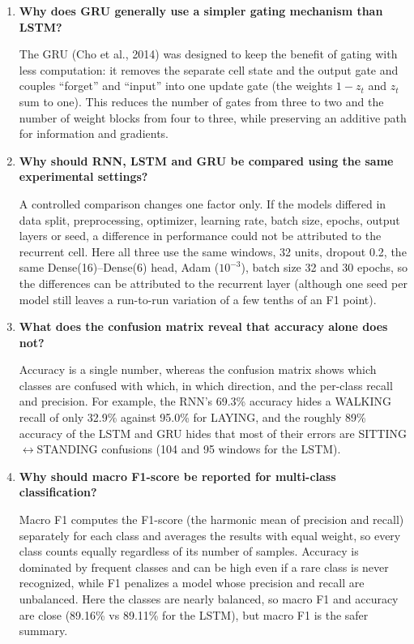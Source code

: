 \documentclass[10pt]{article}
\begin{document}
\begin{enumerate}[itemsep=6pt,topsep=3pt]
\item \textbf{Why does GRU generally use a simpler gating mechanism than LSTM?}\par\smallskip
The GRU (Cho et al., 2014) was designed to keep the benefit of gating with less computation: it removes the separate cell state and the output gate and couples ``forget'' and ``input'' into one update gate (the weights $1-z_t$ and $z_t$ sum to one). This reduces the number of gates from three to two and the number of weight blocks from four to three, while preserving an additive path for information and gradients.

\item \textbf{Why should RNN, LSTM and GRU be compared using the same experimental settings?}\par\smallskip
A controlled comparison changes one factor only. If the models differed in data split, preprocessing, optimizer, learning rate, batch size, epochs, output layers or seed, a difference in performance could not be attributed to the recurrent cell. Here all three use the same windows, 32 units, dropout 0.2, the same Dense(16)--Dense(6) head, Adam ($10^{-3}$), batch size 32 and 30 epochs, so the differences can be attributed to the recurrent layer (although one seed per model still leaves a run-to-run variation of a few tenths of an F1 point).

\item \textbf{What does the confusion matrix reveal that accuracy alone does not?}\par\smallskip
Accuracy is a single number, whereas the confusion matrix shows which classes are confused with which, in which direction, and the per-class recall and precision. For example, the RNN's 69.3\% accuracy hides a WALKING recall of only 32.9\% against 95.0\% for LAYING, and the roughly 89\% accuracy of the LSTM and GRU hides that most of their errors are SITTING$\leftrightarrow$STANDING confusions (104 and 95 windows for the LSTM).

\item \textbf{Why should macro F1-score be reported for multi-class classification?}\par\smallskip
Macro F1 computes the F1-score (the harmonic mean of precision and recall) separately for each class and averages the results with equal weight, so every class counts equally regardless of its number of samples. Accuracy is dominated by frequent classes and can be high even if a rare class is never recognized, while F1 penalizes a model whose precision and recall are unbalanced. Here the classes are nearly balanced, so macro F1 and accuracy are close (89.16\% vs 89.11\% for the LSTM), but macro F1 is the safer summary.


\end{enumerate}
\end{document}
